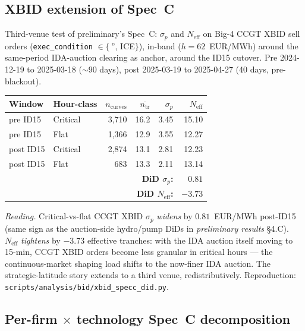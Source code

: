 \documentclass[11pt,a4paper]{article}
\begin{document}
\subsection{XBID extension of Spec~C}\label{sec:prov:xbid_specc}

\noindent Third-venue test of preliminary's Spec~C: $\sigma_p$ and $N_{\text{eff}}$ on Big-4 CCGT XBID sell orders (\texttt{exec\_condition} $\in\{$\,'', ICE$\}$), in-band ($h = 62$~EUR/MWh) around the same-period IDA-auction clearing as anchor, around the ID15 cutover. Pre 2024-12-19 to 2025-03-18 ($\sim\!90$ days), post 2025-03-19 to 2025-04-27 (40 days, pre-blackout).

\begin{center}\footnotesize
\setlength{\tabcolsep}{6pt}
\begin{tabular}{l l r r r r}
\toprule
Window & Hour-class & $n_{\text{curves}}$ & $\overline{n_{\text{tr}}}$ & $\sigma_p$ & $N_{\text{eff}}$ \\
\midrule
pre  ID15 & Critical & 3{,}710 & 16.2 & 3.45 & 15.10 \\
pre  ID15 & Flat     & 1{,}366 & 12.9 & 3.55 & 12.27 \\
post ID15 & Critical & 2{,}874 & 13.1 & 2.81 & 12.23 \\
post ID15 & Flat     &   683 & 13.3 & 2.11 & 13.14 \\
\midrule
\multicolumn{5}{r}{\textbf{DiD $\sigma_p$:}} & \textbf{$0.81$} \\
\multicolumn{5}{r}{\textbf{DiD $N_{\text{eff}}$:}} & \textbf{$-3.73$} \\
\bottomrule
\end{tabular}
\end{center}

\textit{Reading.} Critical-vs-flat CCGT XBID $\sigma_p$ \emph{widens} by $0.81$~EUR/MWh post-ID15 (same sign as the auction-side hydro/pump DiDs in \emph{preliminary results} \S 4.C). $N_{\text{eff}}$ \emph{tightens} by $-3.73$ effective tranches: with the IDA auction itself moving to 15-min, CCGT XBID orders become less granular in critical hours --- the continuous-market shaping load shifts to the now-finer IDA auction. The strategic-latitude story extends to a third venue, redistributively. Reproduction: \texttt{scripts/analysis/bid/xbid\_specc\_did.py}.

\subsection{Per-firm $\times$ technology Spec~C decomposition}\label{sec:prov:per_firm_tech_shape}
\end{document}
